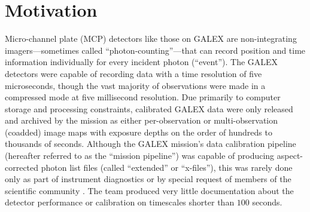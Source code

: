 \documentclass[preprint]{aastex}
\begin{document}
\section{Motivation}
\label{motivation}
Micro-channel plate (MCP) detectors like those on GALEX are non-integrating imagers---sometimes called ``photon-counting''---that can record position and time information individually for every incident photon (``event''). The GALEX detectors were capable of recording data with a time resolution of five microseconds, though the vast majority of observations were made in a compressed mode at five millisecond resolution. Due primarily to computer storage and processing constraints, calibrated GALEX data were only released and archived by the mission as either per-observation or multi-observation (coadded) image maps with exposure depths on the order of hundreds to thousands of seconds. Although the GALEX mission's data calibration pipeline (hereafter referred to as the ``mission pipeline'') was capable of producing aspect-corrected photon list files (called ``extended'' or ``x-files''), this was rarely done only as part of instrument diagnostics or by special request of members of the scientific community \citep{rob2005, wel2006, wel2007}. The team produced very little documentation about the detector performance or calibration on timescales shorter than $100$ seconds.
\end{document}
